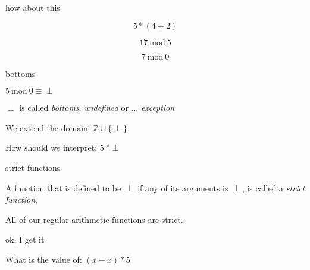 \begin{frame}{how about this}

\pause
$$5 * (4+2)$$

\pause
$$17 \ \mathrm{mod}\  5$$

\pause

$$7 \ \mathrm{mod}\  0$$

\end{frame}

\begin{frame}{bottoms}

\pause

\vspace{20pt}\hspace{60pt}$ 5 \ \mathrm{mod}\ 0 \equiv \perp$

\pause

\vspace{20pt}\hspace{60pt}$\perp$ is called {\em bottoms}, {\em undefined} or ... {\em exception}
\pause

\vspace{20pt}\hspace{60pt}We extend the domain: $\mathbb{Z} \cup \{\perp\}$
\pause 

\vspace{20pt}\hspace{60pt}How should we interpret: $5\ * \perp$

\end{frame}

\begin{frame}{strict functions}

\vspace{20pt}\hspace{80pt}\parbox[l][60pt][l]{240pt}{

A function that is defined to be $\perp$ if any of its arguments is $\perp$, is called a {\em strict function},

\vspace{20pt}All of our regular arithmetic functions are strict.
}

\end{frame}

\begin{frame}{ok, I get it}


\vspace{20pt}\hspace{40pt}What is the value of: $(x - x) * 5$

\end{frame}

